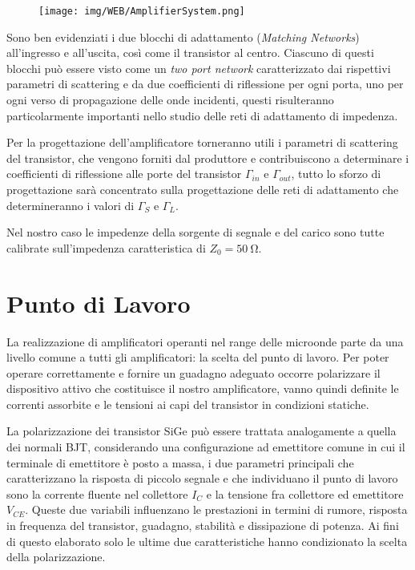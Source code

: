\documentclass[12pt,oneside]{book}
\begin{document}
\begin{figure}[!htbp]
    \centering
    \texttt{[image: img/WEB/AmplifierSystem.png]}
    \caption{}
    \label{amp_sist}
\end{figure}
Sono ben evidenziati i due blocchi di adattamento (\textit{Matching Networks}) all'ingresso e all'uscita, così come il transistor al centro. Ciascuno di questi blocchi può essere visto come un \textit{two port network} caratterizzato dai rispettivi parametri di scattering e da due coefficienti di riflessione per ogni porta, uno per ogni verso di propagazione delle onde incidenti, questi risulteranno particolarmente importanti nello studio delle reti di adattamento di impedenza.

Per la progettazione dell'amplificatore torneranno utili i parametri di scattering del transistor, che vengono forniti dal produttore e contribuiscono a determinare i coefficienti di riflessione alle porte del transistor $\Gamma_{in}$ e $\Gamma_{out}$, tutto lo sforzo di progettazione sarà concentrato sulla progettazione delle reti di adattamento che determineranno i valori di $\Gamma_{S}$ e $\Gamma_{L}$.

Nel nostro caso le impedenze della sorgente di segnale e del carico sono tutte calibrate sull'impedenza caratteristica di $Z_{0}=\SI{50}{\ohm}$.

\section{Punto di Lavoro}
\label{sub_q_point}
La realizzazione di amplificatori operanti nel range delle microonde parte da una livello comune a tutti gli amplificatori: la scelta del punto di lavoro. Per poter operare correttamente e fornire un guadagno adeguato occorre polarizzare il dispositivo attivo che costituisce il nostro amplificatore, vanno quindi definite le correnti assorbite e le tensioni ai capi del transistor in condizioni statiche.

La polarizzazione dei transistor SiGe può essere trattata analogamente a quella dei normali BJT, considerando una configurazione ad emettitore comune in cui il terminale di emettitore è posto a massa, i due parametri principali che caratterizzano la risposta di piccolo segnale e che individuano il punto di lavoro sono la corrente fluente nel collettore $I_C$ e la tensione fra collettore ed emettitore $V_{CE}$. Queste due variabili influenzano le prestazioni in termini di rumore, risposta in frequenza del transistor, guadagno, stabilità e dissipazione di potenza. Ai fini di questo elaborato solo le ultime due caratteristiche hanno condizionato la scelta della polarizzazione.
\end{document}
